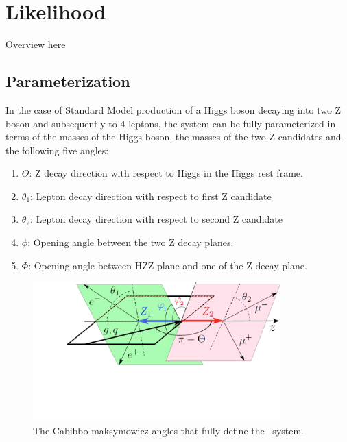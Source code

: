 \documentclass{cmspaper}
\begin{document}
\section{Likelihood}

Overview here

\subsection{Parameterization}

In the case of Standard Model production of a Higgs boson decaying into two Z boson and subsequently to 4 leptons,
the system can be fully parameterized in terms of the masses of the Higgs boson, the masses of the
two Z candidates and the following five angles:

\begin{enumerate}
\item $\Theta$: Z decay direction with respect to Higgs in the Higgs rest frame.
\item $\theta_1$: Lepton decay direction with respect to first Z candidate
\item $\theta_2$: Lepton decay direction with respect to second Z candidate
\item $\phi$: Opening angle between the two Z decay planes.
\item $\Phi$: Opening angle between HZZ plane and one of the Z decay plane.
\end{enumerate}

\begin{figure}[htb!]
  \begin{center}
    \includegraphics[width=0.85\textwidth]{figures/HiggsSystemDiagram.pdf}
    \caption{ The Cabibbo-maksymowicz angles that fully define the \HiggsToZZ\ system.
    }  
    \label{fig:HiggsSystemDiagram}
  \end{center}
\end{figure}
\end{document}
